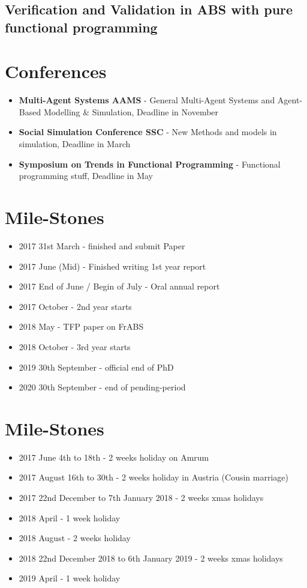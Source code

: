 \subsection{Verification and Validation in ABS with pure functional programming}

\section{Conferences}
\begin{itemize}
	\item \textbf{Multi-Agent Systems AAMS} - General Multi-Agent Systems and Agent-Based Modelling \& Simulation, Deadline in November
	\item \textbf{Social Simulation Conference SSC} - New Methods and models in simulation, Deadline in March
	\item \textbf{Symposium on Trends in Functional Programming} - Functional programming stuff, Deadline in May
\end{itemize}

\section{Mile-Stones}
\begin{itemize}
	\item 2017 31st March - finished and submit Paper 
	\item 2017 June (Mid) - Finished writing 1st year report 
	\item 2017 End of June / Begin of July - Oral annual report
	\item 2017 October - 2nd year starts
	\item 2018 May - TFP paper on FrABS
	\item 2018 October - 3rd year starts
	\item 2019 30th September - official end of PhD
	\item 2020 30th September - end of pending-period
\end{itemize}

\section{Mile-Stones}
\begin{itemize}
	\item 2017 June 4th to 18th - 2 weeks holiday on Amrum 
	\item 2017 August 16th to 30th - 2 weeks holiday in Austria (Cousin marriage)
	\item 2017 22nd December to 7th January 2018 - 2 weeks xmas holidays
	\item 2018 April - 1 week holiday
	\item 2018 August - 2 weeks holiday
	\item 2018 22nd December 2018 to 6th January 2019 - 2 weeks xmas holidays
	\item 2019 April - 1 week holiday
\end{itemize}
